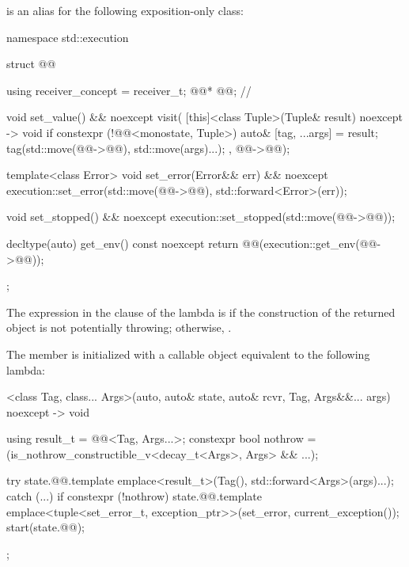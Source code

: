 \pnum
{} is an alias for the following exposition-only class:
\begin{codeblock}
namespace std::execution {
  struct @@ {
    using receiver_concept = receiver_t;
    @@* @@;          // \expos

    void set_value() && noexcept {
      visit(
        [this]<class Tuple>(Tuple& result) noexcept -> void {
          if constexpr (!@@<monostate, Tuple>) {
            auto& [tag, ...args] = result;
            tag(std::move(@@->@@), std::move(args)...);
          }
        },
        @@->@@);
    }

    template<class Error>
    void set_error(Error&& err) && noexcept {
      execution::set_error(std::move(@@->@@), std::forward<Error>(err));
    }

    void set_stopped() && noexcept {
      execution::set_stopped(std::move(@@->@@));
    }

    decltype(auto) get_env() const noexcept {
      return @@(execution::get_env(@@->@@));
    }
  };
}
\end{codeblock}

\pnum
The expression in the  clause of the lambda is 
if the construction of the returned  object
is not potentially throwing;
otherwise, .

\pnum
The member 
is initialized with a callable object equivalent to the following lambda:
\begin{codeblock}
[]<class Tag, class... Args>(auto, auto& state, auto& rcvr, Tag, Args&&... args) noexcept
    -> void {
  using result_t = @@<Tag, Args...>;
  constexpr bool nothrow = (is_nothrow_constructible_v<decay_t<Args>, Args> && ...);

  try {
    state.@@.template emplace<result_t>(Tag(), std::forward<Args>(args)...);
  } catch (...) {
    if constexpr (!nothrow)
      state.@@.template emplace<tuple<set_error_t,
                                                exception_ptr>>(set_error, current_exception());
  }
  start(state.@@);
};
\end{codeblock}


